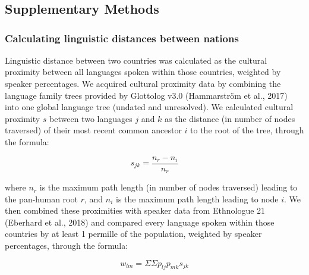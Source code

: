 \documentclass[
  man,floatsintext]{apa6}
\begin{document}
\endgroup

\newpage

\hypertarget{appendix-appendix}{%
\appendix}


\renewcommand{\appendixname}{\bf{Supplementary Materials}}
\renewcommand{\thefigure}{S\arabic{figure}} \setcounter{figure}{0}
\renewcommand{\thetable}{S\arabic{table}} \setcounter{table}{0}
\renewcommand{\theequation}{S\arabic{table}} \setcounter{equation}{0}

\hypertarget{section}{%
\section{}\label{section}}

\hypertarget{supplementary-methods}{%
\subsection{Supplementary Methods}\label{supplementary-methods}}

\hypertarget{calculating-linguistic-distances-between-nations}{%
\subsubsection{Calculating linguistic distances between nations}\label{calculating-linguistic-distances-between-nations}}

Linguistic distance between two countries was calculated as the cultural proximity between all languages spoken within those countries, weighted by speaker percentages. We acquired cultural proximity data by combining the language family trees provided by Glottolog v3.0 (Hammarström et al., 2017) into one global language tree (undated and unresolved). We calculated cultural proximity \(s\) between two languages \(j\) and \(k\) as the distance (in number of nodes traversed) of their most recent common ancestor \(i\) to the root of the tree, through the formula:

\[
s_{jk} = \frac{n_{r}-n_{i}}{n_{r}}
\]

where \(n_{r}\) is the maximum path length (in number of nodes traversed) leading to the pan-human root \(r\), and \(n_{i}\) is the maximum path length leading to node \(i\). We then combined these proximities with speaker data from Ethnologue 21 (Eberhard et al., 2018) and compared every language spoken within those countries by at least 1 permille of the population, weighted by speaker percentages, through the formula:

\[
w_{lm} = {\Sigma}{\Sigma}p_{lj}p_{mk}s_{jk}
\]
\end{document}
